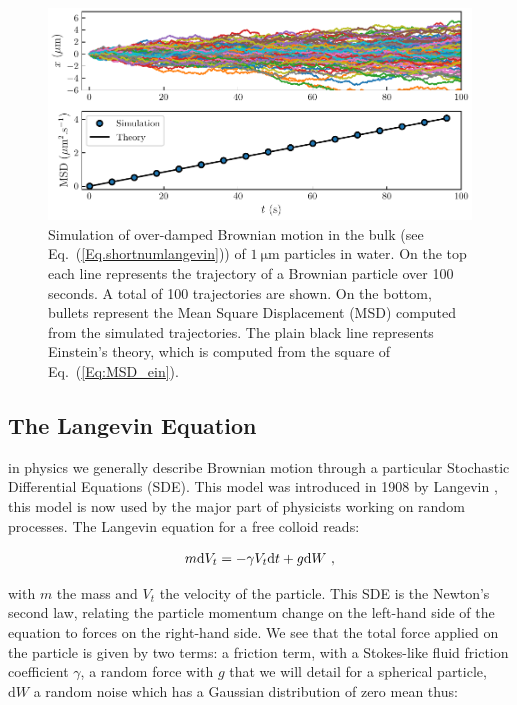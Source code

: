 \begin{figure}[!h]
	\centering
	\includegraphics{02_body/chapter1/image/brown_exemple.pdf}
	\caption{Simulation of over-damped Brownian motion in the bulk (see Eq.~(\ref{Eq.shortnumlangevin})) of $1 ~ \mathrm{\mu m}$ particles in water. On the top each line represents the trajectory of a Brownian particle over 100 seconds. A total of 100 trajectories are shown. On the bottom, bullets represent the Mean Square Displacement (\gls{MSD}) computed from the simulated trajectories. The plain black line represents Einstein's theory, which is computed from the square of Eq.~(\ref{Eq:MSD_ein}).\href{https://github.com/eXpensia/Confined-Brownian-Motion/blob/main/02_body/chapter1/image/simple_Brownian.ipynb}{\faGithub}}
	\label{fig:bulkbrown}
\end{figure}

\subsection{The Langevin Equation}

in physics we generally describe Brownian motion through a particular Stochastic Differential Equations (\gls{SDE}). This model was introduced in 1908 by Langevin \cite{langevin_sur_1908}, this model is now used by the major part of physicists working on random processes. The Langevin equation for a free colloid reads:

\begin{equation}
	m \textnormal{d}V_t  = - \gamma V_t \textnormal{d}t + g \textnormal{d}W ~,
	\label{Eq.langevinEquation}
\end{equation}


with $m$ the mass and $V_t$ the velocity of the particle. This \gls{SDE} is the Newton's second law, relating the particle momentum change on the left-hand side of the equation to forces on the right-hand side. We see that the total force applied on the particle is given by two terms: a friction term, with a Stokes-like fluid friction coefficient $\gamma$, a random force with $g$ that we will detail for a spherical particle, $\mathrm{d}W$ a random noise which has a Gaussian distribution of zero mean thus:


